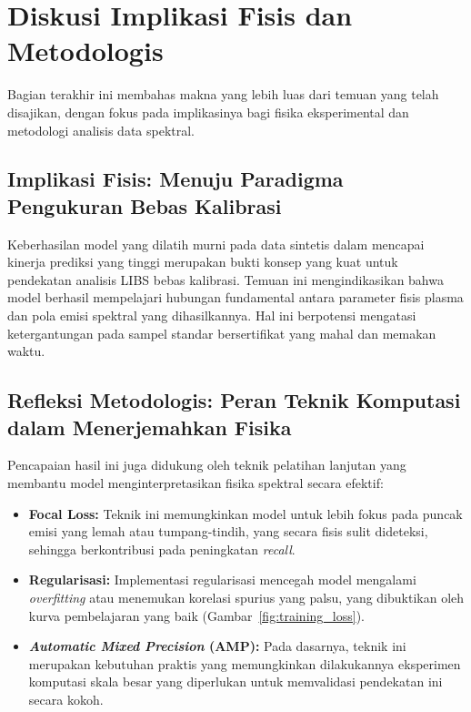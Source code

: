 \section{Diskusi Implikasi Fisis dan Metodologis}
\label{sec:diskusi_implikasi}
Bagian terakhir ini membahas makna yang lebih luas dari temuan yang telah disajikan, dengan fokus pada implikasinya bagi fisika eksperimental dan metodologi analisis data spektral.

\subsection{Implikasi Fisis: Menuju Paradigma Pengukuran Bebas Kalibrasi}
Keberhasilan model yang dilatih murni pada data sintetis dalam mencapai kinerja prediksi yang tinggi merupakan bukti konsep yang kuat untuk pendekatan analisis LIBS bebas kalibrasi. Temuan ini mengindikasikan bahwa model berhasil mempelajari hubungan fundamental antara parameter fisis plasma dan pola emisi spektral yang dihasilkannya. Hal ini berpotensi mengatasi ketergantungan pada sampel standar bersertifikat yang mahal dan memakan waktu.

\subsection{Refleksi Metodologis: Peran Teknik Komputasi dalam Menerjemahkan Fisika}
Pencapaian hasil ini juga didukung oleh teknik pelatihan lanjutan yang membantu model menginterpretasikan fisika spektral secara efektif:
\begin{itemize}
    \item \textbf{Focal Loss:} Teknik ini memungkinkan model untuk lebih fokus pada puncak emisi yang lemah atau tumpang-tindih, yang secara fisis sulit dideteksi, sehingga berkontribusi pada peningkatan \textit{recall}.
    \item \textbf{Regularisasi:} Implementasi regularisasi mencegah model mengalami \textit{overfitting} atau menemukan korelasi spurius yang palsu, yang dibuktikan oleh kurva pembelajaran yang baik (Gambar~\ref{fig:training_loss}).
    \item \textbf{\textit{Automatic Mixed Precision} (AMP):} Pada dasarnya, teknik ini merupakan kebutuhan praktis yang memungkinkan dilakukannya eksperimen komputasi skala besar yang diperlukan untuk memvalidasi pendekatan ini secara kokoh.
\end{itemize}

